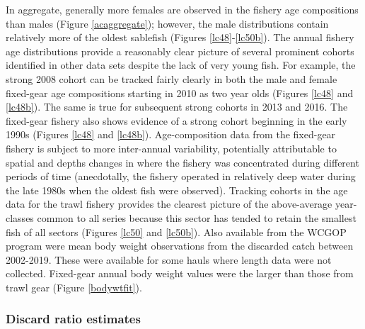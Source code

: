 \documentclass[11pt,
  english,
  a4paper,
]{article}
\begin{document}
\leavevmode\tagmcend\tagstructend\par


In aggregate, generally more females are observed in the fishery age compositions than males (Figure \ref{acaggregate}); however, the male distributions contain relatively more of the oldest sablefish (Figures \ref{lc48}-\ref{lc50b}). The annual fishery age distributions provide a reasonably clear picture of several prominent cohorts identified in other data sets despite the lack of very young fish. For example, the strong 2008 cohort can be tracked fairly clearly in both the male and female fixed-gear age compositions starting in 2010 as two year olds (Figures \ref{lc48} and \ref{lc48b}). The same is true for subsequent strong cohorts in 2013 and 2016. The fixed-gear fishery also shows evidence of a strong cohort beginning in the early 1990s (Figures \ref{lc48} and \ref{lc48b}). Age-composition data from the fixed-gear fishery is subject to more inter-annual variability, potentially attributable to spatial and depths changes in where the fishery was concentrated during different periods of time (anecdotally, the fishery operated in relatively deep water during the late 1980s when the oldest fish were observed). Tracking cohorts in the age data for the trawl fishery provides the clearest picture of the above-average year-classes common to all series because this sector has tended to retain the smallest fish of all sectors (Figures \ref{lc50} and \ref{lc50b}). Also available from the WCGOP program were mean body weight observations from the discarded catch between 2002-2019. These were available for some hauls where length data were not collected. Fixed-gear annual body weight values were the larger than those from trawl gear (Figure \ref{bodywtfit}).

\leavevmode\tagmcend\tagstructend\par


\hypertarget{discard-ratio-estimates}{%
\subsubsection{Discard ratio estimates}\label{discard-ratio-estimates}}

\leavevmode\tagmcend\tagstructend

\end{document}
